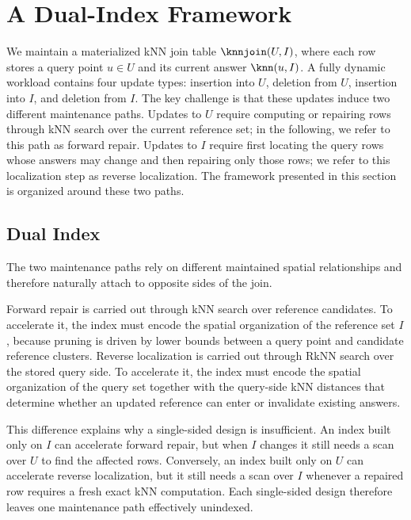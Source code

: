 \section{A Dual-Index Framework}
\label{sec:framework}

We maintain a materialized kNN join table $\knnjoin(U,I)$, where each row stores a query point $u\in U$ and its current answer $\knn(u,I)$. A fully dynamic workload contains four update types: insertion into $U$, deletion from $U$, insertion into $I$, and deletion from $I$. The key challenge is that these updates induce two different maintenance paths. Updates to $U$ require computing or repairing rows through kNN search over the current reference set; in the following, we refer to this path as forward repair. Updates to $I$ require first locating the query rows whose answers may change and then repairing only those rows; we refer to this localization step as reverse localization. The framework presented in this section is organized around these two paths.

\subsection{Dual Index}
\label{subsec:framework-why-dual}

The two maintenance paths rely on different maintained spatial relationships and therefore naturally attach to opposite sides of the join.

Forward repair is carried out through kNN search over reference candidates. To accelerate it, the index must encode the spatial organization of the reference set $I$, because pruning is driven by lower bounds between a query point and candidate reference clusters. Reverse localization is carried out through RkNN search over the stored query side. To accelerate it, the index must encode the spatial organization of the query set together with the query-side kNN distances that determine whether an updated reference can enter or invalidate existing answers.

This difference explains why a single-sided design is insufficient. An index built only on $I$ can accelerate forward repair, but when $I$ changes it still needs a scan over $U$ to find the affected rows. Conversely, an index built only on $U$ can accelerate reverse localization, but it still needs a scan over $I$ whenever a repaired row requires a fresh exact kNN computation. Each single-sided design therefore leaves one maintenance path effectively unindexed.

